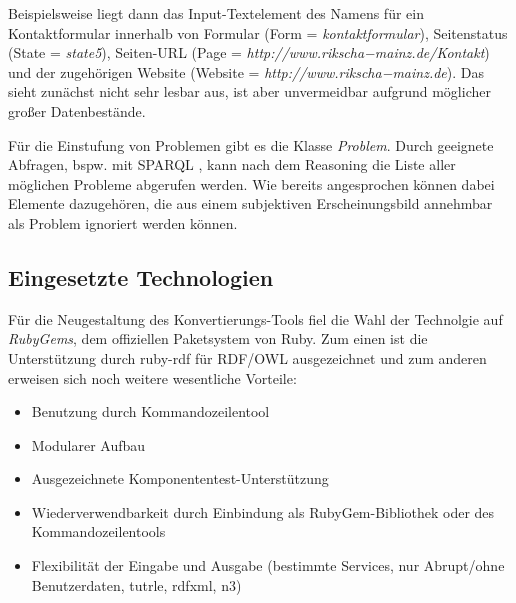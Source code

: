 \documentclass[runningheads,a4paper]{llncs}
\begin{document}

 
Beispielsweise liegt dann das Input-Textelement des Namens für ein Kontaktformular innerhalb von Formular (Form = \textit{kontaktformular}), Seitenstatus (State = \textit{state5}), Seiten-URL (Page = \textit{http://www.rikscha−mainz.de/Kontakt}) und der zugehörigen Website (Website = \textit{http://www.rikscha−mainz.de}).
Das sieht zunächst nicht sehr lesbar aus, ist aber unvermeidbar aufgrund möglicher großer Datenbestände. 
 
Für die Einstufung von Problemen gibt es die Klasse \textit{Problem}. 
Durch geeignete Abfragen, bspw. mit SPARQL \cite{sparql}, kann nach dem Reasoning die Liste aller möglichen Probleme abgerufen werden. 
Wie bereits angesprochen können dabei Elemente dazugehören, die aus einem subjektiven Erscheinungsbild annehmbar als Problem ignoriert werden können.

\subsection{Eingesetzte Technologien}
\label{sec:technology}

Für die Neugestaltung des Konvertierungs-Tools fiel die Wahl der Technolgie auf \textit{RubyGems}, dem offiziellen Paketsystem von Ruby. 
Zum einen ist die Unterstützung durch ruby-rdf \cite{ruby-rdf} für RDF/OWL ausgezeichnet und zum anderen erweisen sich noch weitere wesentliche Vorteile:

\begin{itemize}
    \item{Benutzung durch Kommandozeilentool}
    \item{Modularer Aufbau}
    \item{Ausgezeichnete Komponententest-Unterstützung}
    \item{Wiederverwendbarkeit durch Einbindung als RubyGem-Bibliothek oder des Kommandozeilentools}
    \item{Flexibilität der Eingabe und Ausgabe (bestimmte Services, nur Abrupt/ohne Benutzerdaten, tutrle, rdfxml, n3)}
\end{itemize}
\end{document}
